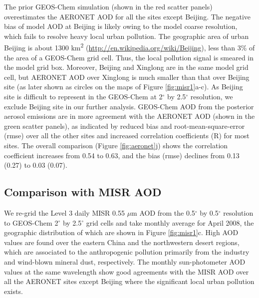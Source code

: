  The prior GEOS-Chem simulation (shown in the red scatter panels)
 overestimates the AERONET AOD for all the sites except Beijing.
 The negative bias of model AOD at Beijing is likely owing to the model coarse resolution,
 which fails to resolve heavy local urban pollution.
 The geographic area of urban Beijing is about 1300 km\textsuperscript{2}
 (\url{http://en.wikipedia.org/wiki/Beijing}),
 less than 3\% of the area of a GEOS-Chem grid cell.
 Thus, the local pollution signal is smeared in the model grid box.
 Moreover, Beijing and Xinglong are in the same model grid cell,
 but AERONET AOD over Xinglong is much smaller than that over Beijing site
 (as later shown as circles on the maps of Figure \ref{fig:misr1}a-c).
 As Beijing site is difficult to represent in the GEOS-Chem at 2$^{\circ}$ by 2.5$^{\circ}$ resolution,
 we exclude Beijing site in our further analysis.
 GEOS-Chem AOD from the posterior aerosol emissions are in more agreement with the AERONET AOD
 (shown in the green scatter panels),
 as indicated by reduced bias and root-mean-square-error (rmse) over all the other sites and
 increased correlation coefficients (R) for most sites.
 The overall comparison (Figure \ref{fig:aeronet}j) shows the correlation coefficient
 increases from 0.54 to 0.63, and the bias (rmse) declines from 0.13 (0.27) to 0.03 (0.07). 

 \subsection{Comparison with MISR AOD }

 We re-grid the Level 3 daily MISR 0.55 $\mu$m AOD from the 0.5$^{\circ}$ by 0.5$^{\circ}$
 resolution to GEOS-Chem 2$^{\circ}$ by 2.5$^{\circ}$ grid cells and take monthly average for April 2008,
 the geographic distribution of which are shown in Figure \ref{fig:misr1}c.
 High AOD values are found over the eastern China and the northwestern desert regions,
 which are associated to the anthropogenic pollution primarily from
 the industry and wind-blown mineral dust, respectively.
 The monthly sun-photometer AOD values at the same wavelength show
 good agreements with the MISR AOD over all the AERONET sites
 except Beijing where the significant local urban pollution exists.

